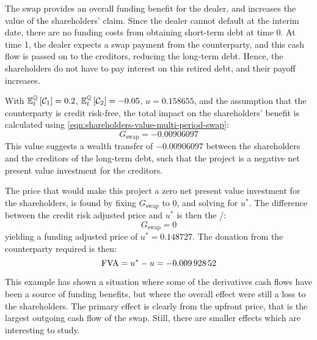 \documentclass[main.tex]{subfiles}
\begin{document}
        The swap provides an overall funding benefit for the dealer,
        and increases the value of the shareholders' claim.
        Since the dealer cannot default at the interim date,
        there are no funding costs from obtaining short-term debt at time 0.
        At time 1, the dealer expects a swap payment from the counterparty,
        and this cash flow is passed on to the creditors, reducing the long-term debt.
        Hence, the shareholders do not have to pay interest on this retired debt,
        and their payoff increases.

        With $\mathbb{E}_{t}^{\mathbb{Q}}\left[\mathcal{C}_1\right]=\num{0.2}$,
        $\mathbb{E}_{t}^{\mathbb{Q}}\left[\mathcal{C}_2\right]=\num{-0.05}$,
        $u=\num{0.158655}$,
        and the assumption that the counterparty is credit risk-free,
        the total impact on the shareholders' benefit is calculated using \cref{eqn:shareholders-value-multi-period-swap}:
        \begin{equation}
            G_{\text{swap}} = \num{-0.00906097}
        \end{equation}
        This value suggests a wealth transfer of $\num{-0.00906097}$
        between the shareholders and the creditors of the long-term debt,
        such that the project is a negative net present value investment for the creditors.

        The price that would make this project a zero net present value investment for the shareholders,
        is found by fixing $G_{\text{swap}}$ to 0,
        and solving for $u^{\ast}$.
        The difference between the credit risk adjusted price and $u^{\ast}$ is then the \FVA/:
        \begin{equation}
            G_{\text{swap}} = 0
        \end{equation}
        yielding a funding adjusted price of $u^{\ast} = \num{0.148727}$.
        The donation from the counterparty required is then:
        \begin{equation}
            \FVA/ = u^{\ast} - u = \num{-0.00992852}
        \end{equation}

        This example has shown a situation where some of the derivatives cash flows have
        been a source of funding benefits,
        but where the overall effect were still a loss to the shareholders.
        The primary effect is clearly from the upfront price,
        that is the largest outgoing cash flow of the swap.
        Still, there are smaller effects which are interesting to study.
\end{document}
